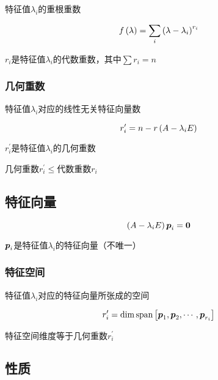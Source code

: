 \documentclass{article}
\begin{document}
特征值$\lambda_i$的重根重数

\[f\left(\lambda\right)=\sum_i\left(\lambda-\lambda_i\right)^{r_i}\]

$r_i$是特征值$\lambda_i$的代数重数，其中$\sum r_i=n$

\subsubsection{几何重数}

特征值$\lambda_i$对应的线性无关特征向量数

\[r^\prime_i=n-r\left(A-\lambda_iE\right)\]

$r^\prime_i$是特征值$\lambda_i$的几何重数

几何重数$r^\prime_i\leqslant$代数重数$r_i$

\subsection{特征向量}

\[\left(A-\lambda_iE\right)\boldsymbol p_i=\boldsymbol0\]

$\boldsymbol p_i$是特征值$\lambda_i$的特征向量（不唯一）

\subsubsection{特征空间}

特征值$\lambda_i$对应的特征向量所张成的空间

\[r^\prime_i=\dim\mathrm{span}\left[\boldsymbol p_1,\boldsymbol p_2,\cdots,\boldsymbol p_{r_i}\right]\]

特征空间维度等于几何重数$r^\prime_i$

\subsection{性质}
\end{document}
